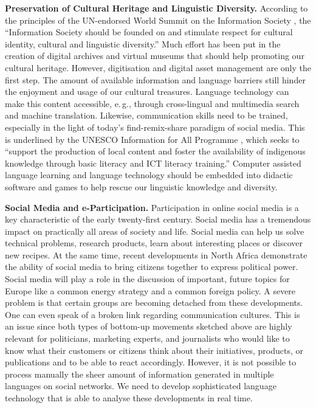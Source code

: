\documentclass[10pt, plain]{../../metanetpaper}
\begin{document}
\begin{multicols}{2}
\textbf{Preservation of Cultural Heritage and Linguistic Diversity.} According to the principles of the UN-endorsed World Summit on the Information Society \cite{worldsummit2003}, the “Information Society should be founded on and stimulate respect for cultural identity, cultural and linguistic diversity.” Much effort has been put in the creation of digital archives and virtual museums that should help promoting our cultural heritage. However, digitisation and digital asset management are only the first step. The amount of available information and language barriers still hinder the enjoyment and usage of our cultural treasures. Language technology can make this content accessible, e.\,g., through cross-lingual and multimedia search and machine translation. Likewise, communication skills need to be trained, especially in the light of today’s find-remix-share paradigm of social media. This is underlined by the UNESCO Information for All Programme \cite{Unesco2}, which seeks to “support the production of local content and foster the availability of indigenous knowledge through basic literacy and ICT literacy training.” Computer assisted language learning and language technology should be embedded into didactic software and games to help rescue our linguistic knowledge and diversity.

\textbf{Social Media and e-Participation.} Participation in online social media is a key characteristic of the early twenty-first century. Social media has a tremendous impact on practically all areas of society and life. Social media can help us solve technical problems, research products, learn about interesting places or discover new recipes. At the same time, recent developments in North Africa demonstrate the ability of social media to bring citizens together to express political power. Social media will play a role in the discussion of important, future topics for Europe like a common energy strategy and a common foreign policy.  A severe problem is that certain groups are becoming detached from these developments. One can even speak of a broken link regarding communication cultures. This is an issue since both types of bottom-up movements sketched above are highly relevant for politicians, marketing experts, and journalists who would like to know what their customers or citizens think about their initiatives, products, or publications and to be able to react accordingly. However, it is not possible to process manually the sheer amount of information generated in multiple languages on social networks. We need to develop sophisticated language technology that is able to analyse these developments in real time.


\end{multicols}
\end{document}

